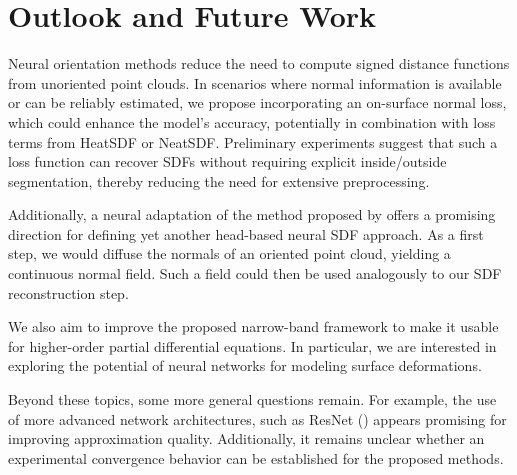 \documentclass[12pt,openany]{book}
\theoremstyle{plainnormal}
\theoremstyle{remark}
\begin{document}
\section{Outlook and Future Work}
Neural orientation methods reduce the need to compute signed distance functions from unoriented point clouds. In scenarios where normal information is available or can be reliably estimated, we propose incorporating an on-surface normal loss, which could enhance the model's accuracy, potentially in combination with loss terms from HeatSDF or NeatSDF. Preliminary experiments suggest that such a loss function can recover SDFs without requiring explicit inside/outside segmentation, thereby reducing the need for extensive preprocessing.\par
Additionally, a neural adaptation of the method proposed by \cite{FengCrane} offers a promising direction for defining yet another head-based neural SDF approach. As a first step, we would diffuse the normals of an oriented point cloud, yielding a continuous normal field. Such a field could then be used analogously to our SDF reconstruction step.\par
We also aim to improve the proposed narrow-band framework to make it usable for higher-order partial differential equations. In particular, we are interested in exploring the potential of neural networks for modeling surface deformations.\par
Beyond these topics, some more general questions remain. For example, the use of more advanced network architectures, such as ResNet (\cite{he2015deepresiduallearningimage}) appears promising for improving approximation quality. Additionally, it remains unclear whether an experimental convergence behavior can be established for the proposed methods.
\endgroup

\appendix
\end{document}
